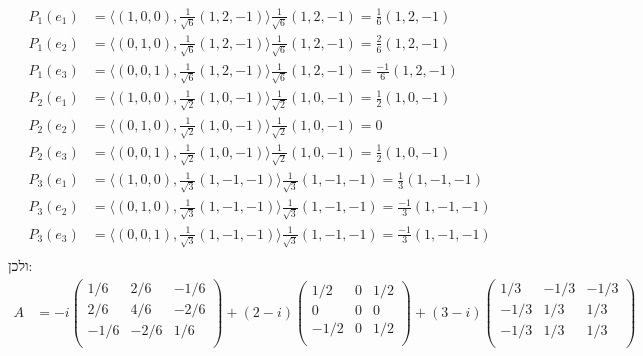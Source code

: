 \documentclass{article}
\begin{document}
\begin{align*}
    P_1(e_1) & = \langle (1,0,0), \frac{1}{\sqrt{6}}(1, 2, -1) \rangle \frac{1}{\sqrt{6}}(1, 2, -1) = \frac{1}{6} (1, 2, -1)     \\
    P_1(e_2) & = \langle (0,1,0), \frac{1}{\sqrt{6}}(1, 2, -1) \rangle \frac{1}{\sqrt{6}}(1, 2, -1) = \frac{2}{6} (1, 2, -1)     \\
    P_1(e_3) & = \langle (0,0,1), \frac{1}{\sqrt{6}}(1, 2, -1) \rangle \frac{1}{\sqrt{6}}(1, 2, -1) = \frac{-1}{6} (1, 2, -1)    \\
    P_2(e_1) & = \langle (1,0,0), \frac{1}{\sqrt{2}}(1, 0, -1) \rangle\frac{1}{\sqrt{2}}(1, 0, -1) = \frac{1}{2} (1, 0, -1)      \\
    P_2(e_2) & = \langle (0,1,0), \frac{1}{\sqrt{2}}(1, 0, -1) \rangle \frac{1}{\sqrt{2}}(1, 0, -1) = 0                          \\
    P_2(e_3) & = \langle (0,0,1), \frac{1}{\sqrt{2}}(1, 0, -1) \rangle \frac{1}{\sqrt{2}}(1, 0, -1) = \frac{1}{2} (1, 0, -1)     \\
    P_3(e_1) & = \langle (1,0,0), \frac{1}{\sqrt{3}}(1, -1, -1) \rangle \frac{1}{\sqrt{3}}(1, -1, -1) = \frac{1}{3} (1, -1, -1)  \\
    P_3(e_2) & = \langle (0,1,0), \frac{1}{\sqrt{3}}(1, -1, -1) \rangle\frac{1}{\sqrt{3}}(1, -1, -1) = \frac{-1}{3} (1, -1, -1)  \\
    P_3(e_3) & = \langle (0,0,1), \frac{1}{\sqrt{3}}(1, -1, -1) \rangle \frac{1}{\sqrt{3}}(1, -1, -1) = \frac{-1}{3} (1, -1, -1) \\
\end{align*}
ולכן:
\begin{align*}
    A & = -i\begin{pmatrix}
                1/6  & 2/6  & -1/6 \\
                2/6  & 4/6  & -2/6 \\
                -1/6 & -2/6 & 1/6  \\
            \end{pmatrix}+(2-i)\begin{pmatrix}
                                   1/2  & 0 & 1/2 \\
                                   0    & 0 & 0   \\
                                   -1/2 & 0 & 1/2 \\
                               \end{pmatrix}+(3-i)\begin{pmatrix}
                                                      1/3  & -1/3 & -1/3 \\
                                                      -1/3 & 1/3  & 1/3  \\
                                                      -1/3 & 1/3  & 1/3  \\
                                                  \end{pmatrix}
\end{align*}
\end{document}
